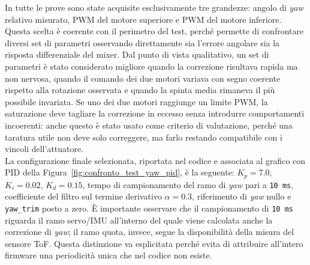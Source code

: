 \documentclass[11pt]{report}
\begin{document}
	In tutte le prove sono state acquisite esclusivamente tre grandezze: angolo di \textit{yaw} relativo misurato, PWM del motore superiore e PWM del motore inferiore. Questa scelta è coerente con il perimetro del test, perché permette di confrontare diversi set di parametri osservando direttamente sia l'errore angolare sia la risposta differenziale del mixer. Dal punto di vista qualitativo, un set di parametri è stato considerato migliore quando la correzione risultava rapida ma non nervosa, quando il comando dei due motori variava con segno coerente rispetto alla rotazione osservata e quando la spinta media rimaneva il più possibile invariata. Se uno dei due motori raggiunge un limite PWM, la saturazione deve tagliare la correzione in eccesso senza introdurre comportamenti incoerenti: anche questo è stato usato come criterio di valutazione, perché una taratura utile non deve solo correggere, ma farlo restando compatibile con i vincoli dell'attuatore.\\
	La configurazione finale selezionata, riportata nel codice e associata al grafico con PID della Figura~\ref{fig:confronto_test_yaw_pid}, è la seguente: \(K_p = 7.0\), \(K_i = 0.02\), \(K_d = 0.15\), tempo di campionamento del ramo di \textit{yaw} pari a \texttt{10 ms}, coefficiente del filtro sul termine derivativo \(\alpha = 0.3\), riferimento di \textit{yaw} nullo e \texttt{yaw\_trim} posto a zero. È importante osservare che il campionamento di \texttt{10 ms} riguarda il ramo servo/IMU all'interno del quale viene calcolata anche la correzione di \textit{yaw}; il ramo quota, invece, segue la disponibilità della misura del sensore ToF. Questa distinzione va esplicitata perché evita di attribuire all'intero firmware una periodicità unica che nel codice non esiste.
	\newpage
\end{document}

